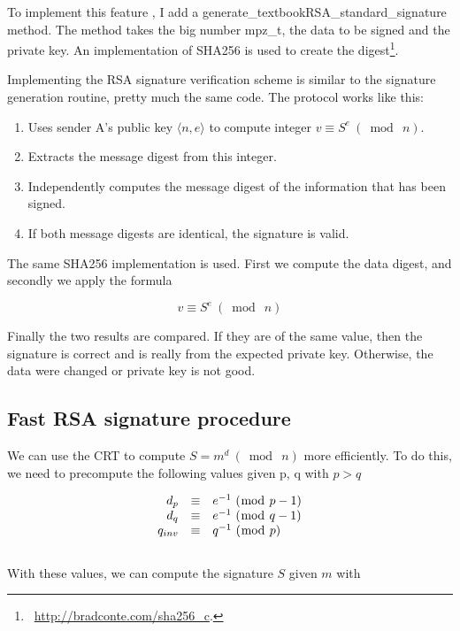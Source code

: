 \documentclass[a4paper]{report}
\begin{document}
To implement this feature , I add a generate\_textbookRSA\_standard\_signature method. The method takes the big number mpz\_t, the data to be signed and the private key. An implementation of SHA256 is used to create the digest\footnote{\ \href{http://bradconte.com/sha256\_c}{\url{http://bradconte.com/sha256\_c}}.}.


Implementing the RSA signature verification scheme is similar to the signature generation routine, pretty much the same code. The protocol works like this:
\begin{enumerate}
    \item Uses sender A's public key $\big \langle n, e \big \rangle$ to compute integer $v \equiv S^e  \ (\bmod{\ n} )$.
    \item Extracts the message digest from this integer.
    \item Independently computes the message digest of the information that has been signed.
    \item If both message digests are identical, the signature is valid.
\end{enumerate}

The same SHA256 implementation is used. First we compute the data digest, and secondly we apply the formula

\[
v \equiv S^e  \ (\bmod{\ n} )
\]

Finally the two results are compared. If they are of the same value, then the signature is correct and is really from the expected private key. Otherwise, the data were changed or private key is not good.


\newpage
\subsection{Fast RSA signature procedure}
We can use the CRT to compute $S = m^d\ (\bmod{\ n})$ more efficiently. To do this, we need to precompute the following values given p, q with $p > q$

\[
\left .
   \begin{array}{r c l}
      d_p      & \equiv & e^{-1} \ (\bmod{\ p - 1} ) \\
      d_q      & \equiv & e^{-1} \ (\bmod{\ q - 1} ) \\
      q_{inv} & \equiv & q^{-1} \ ( \bmod{\ p} )
   \end{array}
\right .
\]
\ 
\\
With these values, we can compute the signature $S$ given $m$ with
\end{document}
